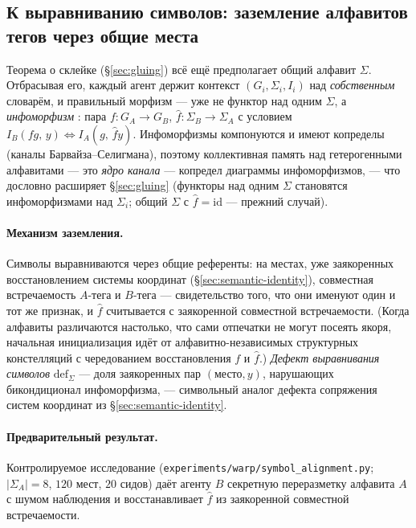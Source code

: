 \documentclass{article}
\newcommand{\method}[1]{\texttt{#1}}
\begin{document}
\subsection{К выравниванию символов: заземление алфавитов тегов через общие места}
\label{sec:symbol-alignment}

Теорема о склейке (\S\ref{sec:gluing}) всё ещё предполагает общий алфавит
$\Sigma$. Отбрасывая его, каждый агент держит контекст $(G_i,\Sigma_i,I_i)$
над \emph{собственным} словарём, и правильный морфизм --- уже не функтор над
одним $\Sigma$, а \emph{инфоморфизм} \citep{barwise1997information}: пара
$f:G_A\!\to\!G_B$, $\hat f:\Sigma_B\!\to\!\Sigma_A$ с условием
$I_B(f g,\,y)\Leftrightarrow I_A(g,\,\hat f y)$. Инфоморфизмы компонуются и
имеют копределы (каналы Барвайза--Селигмана), поэтому коллективная память над
гетерогенными алфавитами --- это \emph{ядро канала} --- копредел диаграммы
инфоморфизмов, --- что дословно расширяет \S\ref{sec:gluing} (функторы над
одним $\Sigma$ становятся инфоморфизмами над $\Sigma_i$; общий $\Sigma$ с
$\hat f=\mathrm{id}$ --- прежний случай).

\paragraph{Механизм заземления.} Символы выравниваются через общие референты:
на местах, уже заякоренных восстановлением системы координат
(\S\ref{sec:semantic-identity}), совместная встречаемость $A$-тега и $B$-тега
--- свидетельство того, что они именуют один и тот же признак, и $\hat f$
считывается с заякоренной совместной встречаемости. (Когда алфавиты
различаются настолько, что сами отпечатки не могут посеять якоря, начальная
инициализация идёт от алфавитно-независимых структурных констелляций с
чередованием восстановления $f$ и $\hat f$.) \emph{Дефект выравнивания
символов} $\mathrm{def}_\Sigma$ --- доля заякоренных пар
$(\text{место},y)$, нарушающих бикондиционал инфоморфизма, --- символьный
аналог дефекта сопряжения систем координат из \S\ref{sec:semantic-identity}.

\paragraph{Предварительный результат.} Контролируемое исследование
(\method{experiments/warp/symbol\_alignment.py}; $|\Sigma_A|{=}8$, $120$ мест,
$20$ сидов) даёт агенту $B$ секретную переразметку алфавита $A$ с шумом
наблюдения и восстанавливает $\hat f$ из заякоренной совместной
встречаемости.
\end{document}

